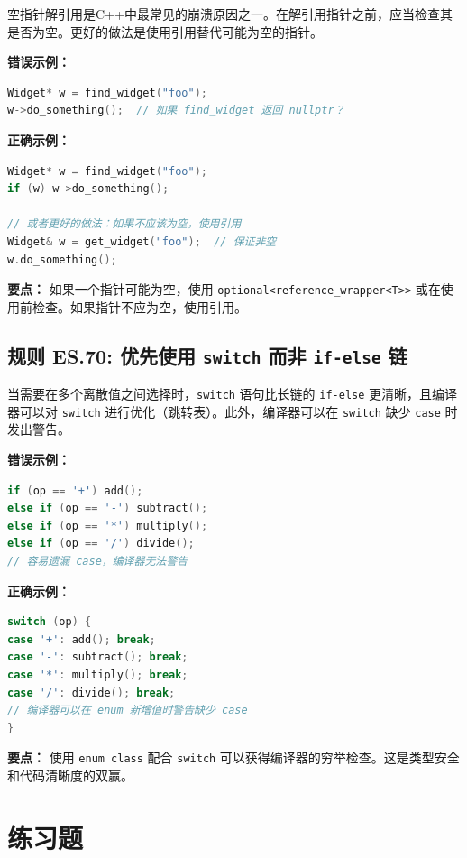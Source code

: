 空指针解引用是C++中最常见的崩溃原因之一。在解引用指针之前，应当检查其是否为空。更好的做法是使用引用替代可能为空的指针。

\textbf{错误示例：}

\begin{lstlisting}[language=C++]
Widget* w = find_widget("foo");
w->do_something();  // 如果 find_widget 返回 nullptr？
\end{lstlisting}

\textbf{正确示例：}

\begin{lstlisting}[language=C++]
Widget* w = find_widget("foo");
if (w) w->do_something();

// 或者更好的做法：如果不应该为空，使用引用
Widget& w = get_widget("foo");  // 保证非空
w.do_something();
\end{lstlisting}

\textbf{要点：} 如果一个指针可能为空，使用 \texttt{optional<reference\_wrapper<T>>} 或在使用前检查。如果指针不应为空，使用引用。

\subsection*{\textbf{规则 ES.70:} 优先使用 \texttt{switch} 而非 \texttt{if-else} 链}

当需要在多个离散值之间选择时，\texttt{switch} 语句比长链的 \texttt{if-else} 更清晰，且编译器可以对 \texttt{switch} 进行优化（跳转表）。此外，编译器可以在 \texttt{switch} 缺少 \texttt{case} 时发出警告。

\textbf{错误示例：}

\begin{lstlisting}[language=C++]
if (op == '+') add();
else if (op == '-') subtract();
else if (op == '*') multiply();
else if (op == '/') divide();
// 容易遗漏 case，编译器无法警告
\end{lstlisting}

\textbf{正确示例：}

\begin{lstlisting}[language=C++]
switch (op) {
case '+': add(); break;
case '-': subtract(); break;
case '*': multiply(); break;
case '/': divide(); break;
// 编译器可以在 enum 新增值时警告缺少 case
}
\end{lstlisting}

\textbf{要点：} 使用 \texttt{enum class} 配合 \texttt{switch} 可以获得编译器的穷举检查。这是类型安全和代码清晰度的双赢。

\section*{练习题}

